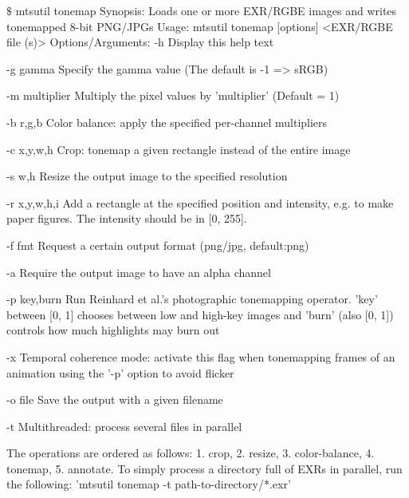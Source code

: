 \begin{console}[label=lst:tonemap-cli,caption=Command line options of the \texttt{mtsutil tonemap} utility]
$\texttt{\$}$ mtsutil tonemap
Synopsis: Loads one or more EXR/RGBE images and writes tonemapped 8-bit PNG/JPGs
Usage: mtsutil tonemap [options] <EXR/RGBE file (s)>
Options/Arguments:
   -h             Display this help text

   -g gamma       Specify the gamma value (The default is -1 => sRGB)

   -m multiplier  Multiply the pixel values by 'multiplier' (Default = 1)

   -b r,g,b       Color balance: apply the specified per-channel multipliers

   -c x,y,w,h     Crop: tonemap a given rectangle instead of the entire image

   -s w,h         Resize the output image to the specified resolution

   -r x,y,w,h,i   Add a rectangle at the specified position and intensity, e.g.
                  to make paper figures. The intensity should be in [0, 255].

   -f fmt         Request a certain output format (png/jpg, default:png)

   -a             Require the output image to have an alpha channel

   -p key,burn    Run Reinhard et al.'s photographic tonemapping operator. 'key'
                  between [0, 1] chooses between low and high-key images and
                  'burn' (also [0, 1]) controls how much highlights may burn out

   -x             Temporal coherence mode: activate this flag when tonemapping 
                  frames of an animation using the '-p' option to avoid flicker

   -o file        Save the output with a given filename

   -t             Multithreaded: process several files in parallel

 The operations are ordered as follows: 1. crop, 2. resize, 3. color-balance, 
 4. tonemap, 5. annotate. To simply process a directory full of EXRs in 
 parallel, run the following: 'mtsutil tonemap -t path-to-directory/*.exr'
\end{console}
